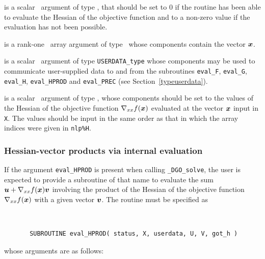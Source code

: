 \documentclass{galahad}
\newcommand{\packagename}{DGO}
\newcommand{\fullpackagename}{\libraryname\_\packagename}
\newcommand{\solver}{{\tt \fullpackagename\_solve}}
\begin{document}
\begin{description}
 is a scalar \intentout\ argument of type \integer,
that should be set to 0 if the routine has been able to evaluate
the Hessian of the objective function
and to a non-zero value if the evaluation has not been possible.

 is a rank-one \intentin\ array argument of type \realdp\
whose components contain the vector ${\bm{x}}$.

 is a scalar \intentinout\ argument of type
{\tt USERDATA\_type} whose components may be used
to communicate user-supplied data to and from the
subroutines {\tt eval\_F}, {\tt eval\_G},
{\tt eval\_H}, {\tt eval\_HPROD} and {\tt eval\_PREC}
(see Section~\ref{typeuserdata}).

 is a scalar \intentout\ argument of type \realdp,
whose components should be set to the values of the Hessian
of the objective function $\nabla_{xx} f({\bm{x}})$
evaluated at the vector ${\bm{x}}$ input in {\tt X}. The values should
be input in the same order as that in which the array indices were
given in {\tt nlp\%H}.

\end{description}


\subsubsection{Hessian-vector products via internal evaluation\label{hvfv}}

If the argument {\tt eval\_HPROD} is present when calling \solver, the
user is expected to provide a subroutine of that name to evaluate the
sum ${\bm{u}} + \nabla_{xx} f({\bm{x}}) {\bm{v}}$ involving the
product of the Hessian of the objective function $\nabla_{xx} f({\bm{x}})$
with a given vector ${\bm{v}}$.
The routine must be specified as

\def\baselinestretch{0.8}
{\tt
\begin{verbatim}
       SUBROUTINE eval_HPROD( status, X, userdata, U, V, got_h )
\end{verbatim} }
\def\baselinestretch{1.0}
\noindent whose arguments are as follows:
\end{document}
